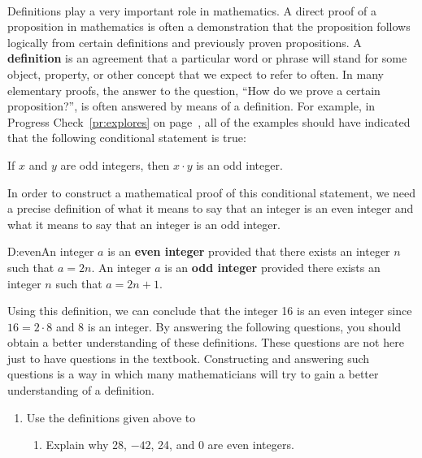 \begin{previewactivity}\label{PA:even} \hfill \\
Definitions play a very important role in mathematics.  A direct proof of a proposition in mathematics is often a demonstration that the proposition follows logically from certain definitions and previously proven propositions.  A \textbf{definition}
%
 is an agreement that a particular word or phrase will stand for some object, property, or other concept that we expect to refer to often.  In many elementary proofs, the answer to the question, ``How do we prove a certain proposition?'', is often answered by means of a definition.  For example, in Progress Check~\ref{pr:explores} on page~\pageref{pr:explores}, all of the examples should have indicated that the following conditional statement is true:
\begin{center}
If  $x$  and  $y$  are odd integers, then $x \cdot y$ is an odd integer.
\end{center}
In order to construct a mathematical proof of this conditional statement, we need a precise definition of what it means to say that an integer is an even integer and what it means to say that an integer is an odd integer.
%
\begin{defbox}{D:even}{An integer  $a$  is an \textbf{even integer} 
%
 provided that there exists an integer  $n$  such that  $a = 2n$. An integer  $a$  is an 
\textbf{odd integer}
%
 provided there exists an integer  $n$  such that  $a = 2n + 1$.}
\end{defbox}
\newpar
\label{def:even}
Using this definition, we can conclude that the integer 16 is an even integer since $16 = 2 \cdot 8$ and 8 is an integer.  By answering the following questions, you should obtain a better understanding of these definitions.  These questions are not here just to have questions in the textbook.  Constructing and answering such questions is a way in which many mathematicians will try to gain a better understanding of a definition.
%
\begin{enumerate}
\item Use the definitions given above to
\begin{enumerate}
\item Explain why  28, $-42$, 24, and 0 are even integers.


\end{enumerate}
\end{enumerate}
\end{previewactivity}
